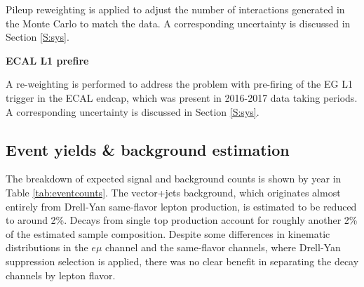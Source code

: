 Pileup reweighting is applied to adjust the number of interactions generated in the Monte Carlo to match the data. A corresponding uncertainty is discussed in Section \ref{S:sys}.

\par \noindent
\textbf{ECAL L1 prefire }

A re-weighting is performed to address the problem with pre-firing of the EG L1 trigger in the ECAL endcap, which was present in 2016-2017 data taking periods. A corresponding uncertainty is discussed in Section \ref{S:sys}.

\subsection{Event yields \& background estimation}
\label{SS:bg}

The breakdown of expected signal and background counts is shown by year in Table \ref{tab:eventcounts}. The vector+jets background, which originates almost entirely from Drell-Yan same-flavor lepton production, is estimated to be reduced to around 2\%. Decays from single top production account for roughly another 2\% of the estimated sample composition. Despite some differences in kinematic distributions in the $e\mu$ channel and the same-flavor channels, where Drell-Yan suppression selection is applied, there was no clear benefit in separating the decay channels by lepton flavor.


